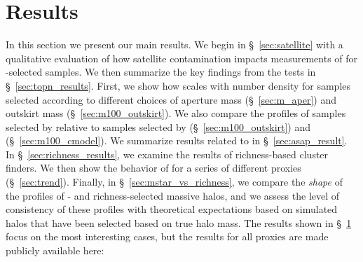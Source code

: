 \documentclass[fleqn,usenatbib,useAMS]{mnras}
\begin{document}
\section{Results}
    \label{sec:result}

    In this section we present our main results. 
    We begin in \S\ \ref{sec:satellite} with a qualitative evaluation of how satellite contamination
    impacts measurements of \dsigma{} for \mstar{}-selected samples.
    We then summarize the key findings from the \topn{} tests in \S\ \ref{sec:topn_results}. 
    First, we show how \scatterMhaloObsSym{} scales with number density for samples selected
    according to different choices of aperture mass (\S\ \ref{sec:m_aper}) and outskirt mass (\S\
    \ref{sec:m100_outskirt}).
    We also compare the \dsigma{} profiles of samples selected by  relative to samples
    selected by \menve{50}{100} (\S\ \ref{sec:m100_outskirt}) and \mcmodel{} (\S\
    \ref{sec:m100_cmodel}).
    We summarize results related to \masap{} in \S\ \ref{sec:asap_result}.
    In \S\ \ref{sec:richness_results}, we examine the \topn{} results of richness-based cluster
    finders.
    We then show the behavior of \scatterMhaloObsSym{} for a series of different \mvir{} proxies
    (\S\ \ref{sec:trend}).
    Finally, in \S\ \ref{sec:mstar_vs_richness}, we compare the {\em shape} of the \dsigma{}
    profiles of \mstar{}- and richness-selected massive halos, and we assess the level of
    consistency of these profiles with theoretical expectations based on simulated halos that have
    been selected based on true halo mass. 
    The results shown in \S\ \ref{sec:result} focus on the most interesting cases, but the \topn{}
    results for all proxies are made publicly available here:
    \href{https://github.com/dr-guangtou/jianbing/tree/master/data/results}{\faGithub}
    
\end{document}
